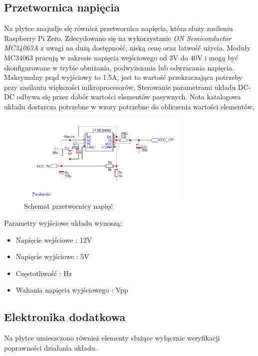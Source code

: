 \documentclass[12pt, eng, twoside, openany, final]{mgr}
\begin{document}
        \subsection{Przetwornica napięcia}
        Na płytce znajudje się również przetwornica napięcia, która służy zasileniu Raspberry Pi Zero. Zdecydowano się na wykorzystanie \emph{ON Semiconductor MC34063A} z uwagi na dużą dostępność, niską cenę oraz łatwość użycia. Moduły MC34063 pracują w zakresie napięcia wejściowego od 3V do 40V i mogą być skonfigurowane w trybie obniżania, podwyższania lub odwracania napięcia. Maksymalny prąd wyjściowy to 1.5A, jest to wartość przekraczająca potrzeby przy zasilaniu większości mikroprocesorów. Sterowanie parametrami układu DC-DC odbywa się przez dobór wartości elementów pasywnych. Nota katalogowa układu dostarcza potrzebne w wzory potrzebne do obliczenia wartości elementów.
                \begin{figure}[H]
                \begin{center}
                    \includegraphics[width=0.75\textwidth]{psu.png}
                    \caption{Schemat przetwornicy napięć}
                \end{center}
                \end{figure}
                
        Parametry wyjściowe układu wynoszą:
        \begin{itemize}
            \item Napięcie wejściowe : 12V
            \item Napięcie wyjściowe : 5V
            \item Częstotliwość      : Hz 
            \item Wahania napięcia wyjściowego : Vpp 
        \end{itemize}
                
        \subsection{Elektronika dodatkowa}
        Na płytce umieszczono również elementy służące wyłącznie weryfikacji poprawności działania układu.
        
\end{document}
